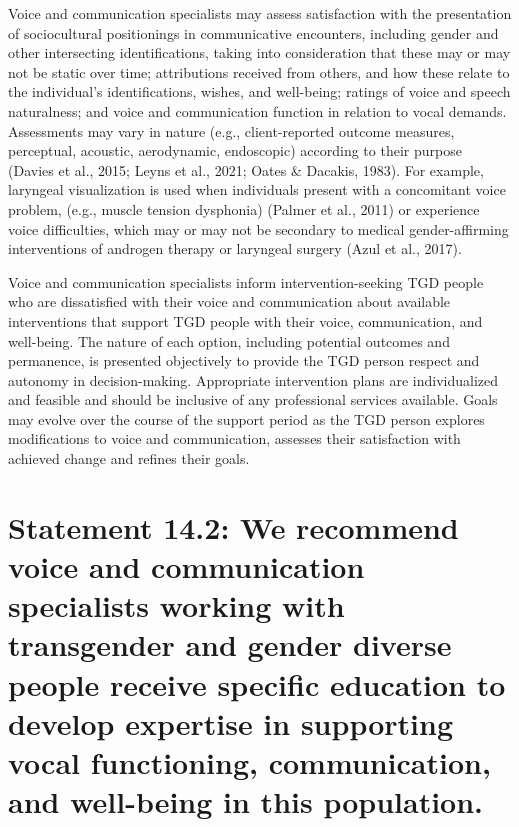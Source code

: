 \documentclass[
]{book}
\begin{document}
Voice and communication specialists may
assess satisfaction with the presentation of sociocultural positionings in communicative encounters, including gender and other intersecting
identifications, taking into consideration that
these may or may not be static over time; attributions received from others, and how these
relate to the individual's identifications, wishes,
and well-being; ratings of voice and speech naturalness; and voice and communication function
in relation to vocal demands. Assessments may
vary in nature (e.g., client-reported outcome measures, perceptual, acoustic, aerodynamic, endoscopic) according to their purpose (Davies et al.,
2015; Leyns et al., 2021; Oates \& Dacakis, 1983).
For example, laryngeal visualization is used when
individuals present with a concomitant voice
problem, (e.g., muscle tension dysphonia) (Palmer
et al., 2011) or experience voice difficulties, which
may or may not be secondary to medical
gender-affirming interventions of androgen therapy or laryngeal surgery (Azul et al., 2017).

Voice and communication specialists inform
intervention-seeking TGD people who are dissatisfied with their voice and communication about
available interventions that support TGD people
with their voice, communication, and well-being.
The nature of each option, including potential
outcomes and permanence, is presented objectively to provide the TGD person respect and
autonomy in decision-making. Appropriate intervention plans are individualized and feasible and
should be inclusive of any professional services
available. Goals may evolve over the course of
the support period as the TGD person explores
modifications to voice and communication,
assesses their satisfaction with achieved change
and refines their goals.

\hypertarget{statement-14.2-we-recommend-voice-and-communication-specialists-working-with-transgender-and-gender-diverse-people-receive-specific-education-to-develop-expertise-in-supporting-vocal-functioning-communication-and-well-being-in-this-population.}{%
\section*{Statement 14.2: We recommend voice and communication specialists working with transgender and gender diverse people receive specific education to develop expertise in supporting vocal functioning, communication, and well-being in this population.}\label{statement-14.2-we-recommend-voice-and-communication-specialists-working-with-transgender-and-gender-diverse-people-receive-specific-education-to-develop-expertise-in-supporting-vocal-functioning-communication-and-well-being-in-this-population.}}
\end{document}
